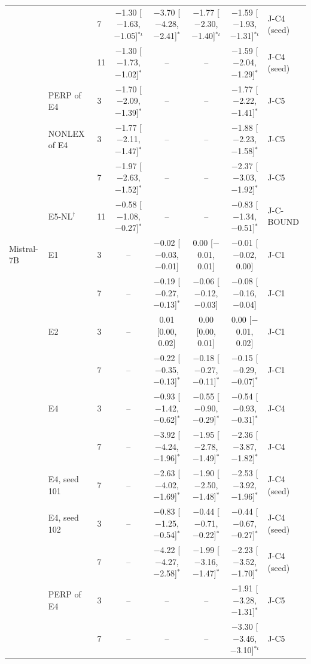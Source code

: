 \begin{tabular}{@{}lllcccc l@{}}
 &  & 7 & $-$1.30 [$-$1.63, $-$1.05]$^{*\iota}$ & $-$3.70 [$-$4.28, $-$2.41]$^{*}$ & $-$1.77 [$-$2.30, $-$1.40]$^{*\iota}$ & $-$1.59 [$-$1.93, $-$1.31]$^{*\iota}$ & J-C4 (seed) \\
 &  & 11 & $-$1.30 [$-$1.73, $-$1.02]$^{*}$ & -- & -- & $-$1.59 [$-$2.04, $-$1.29]$^{*}$ & J-C4 (seed) \\
 & PERP of E4 & 3 & $-$1.70 [$-$2.09, $-$1.39]$^{*}$ & -- & -- & $-$1.77 [$-$2.22, $-$1.41]$^{*}$ & J-C5 \\
 & NONLEX of E4 & 3 & $-$1.77 [$-$2.11, $-$1.47]$^{*}$ & -- & -- & $-$1.88 [$-$2.23, $-$1.58]$^{*}$ & J-C5 \\
 &  & 7 & $-$1.97 [$-$2.63, $-$1.52]$^{*}$ & -- & -- & $-$2.37 [$-$3.03, $-$1.92]$^{*}$ & J-C5 \\
 & E5-NL$^\dagger$ & 11 & $-$0.58 [$-$1.08, $-$0.27]$^{*}$ & -- & -- & $-$0.83 [$-$1.34, $-$0.51]$^{*}$ & J-C-BOUND \\
\midrule
Mistral-7B & E1 & 3 & -- & $-$0.02 [$-$0.03, $-$0.01] & 0.00 [$-$0.01, 0.01] & $-$0.01 [$-$0.02, 0.00] & J-C1 \\
 &  & 7 & -- & $-$0.19 [$-$0.27, $-$0.13]$^{*}$ & $-$0.06 [$-$0.12, $-$0.03] & $-$0.08 [$-$0.16, $-$0.04] & J-C1 \\
 & E2 & 3 & -- & 0.01 [0.00, 0.02] & 0.00 [0.00, 0.01] & 0.00 [$-$0.01, 0.02] & J-C1 \\
 &  & 7 & -- & $-$0.22 [$-$0.35, $-$0.13]$^{*}$ & $-$0.18 [$-$0.27, $-$0.11]$^{*}$ & $-$0.15 [$-$0.29, $-$0.07]$^{*}$ & J-C1 \\
 & E4 & 3 & -- & $-$0.93 [$-$1.42, $-$0.62]$^{*}$ & $-$0.55 [$-$0.90, $-$0.29]$^{*}$ & $-$0.54 [$-$0.93, $-$0.31]$^{*}$ & J-C4 \\
 &  & 7 & -- & $-$3.92 [$-$4.24, $-$1.96]$^{*}$ & $-$1.95 [$-$2.78, $-$1.49]$^{*}$ & $-$2.36 [$-$3.87, $-$1.82]$^{*}$ & J-C4 \\
 & E4, seed 101 & 7 & -- & $-$2.63 [$-$4.02, $-$1.69]$^{*}$ & $-$1.90 [$-$2.50, $-$1.48]$^{*}$ & $-$2.53 [$-$3.92, $-$1.96]$^{*}$ & J-C4 (seed) \\
 & E4, seed 102 & 3 & -- & $-$0.83 [$-$1.25, $-$0.54]$^{*}$ & $-$0.44 [$-$0.71, $-$0.22]$^{*}$ & $-$0.44 [$-$0.67, $-$0.27]$^{*}$ & J-C4 (seed) \\
 &  & 7 & -- & $-$4.22 [$-$4.27, $-$2.58]$^{*}$ & $-$1.99 [$-$3.16, $-$1.47]$^{*}$ & $-$2.23 [$-$3.52, $-$1.70]$^{*}$ & J-C4 (seed) \\
 & PERP of E4 & 3 & -- & -- & -- & $-$1.91 [$-$3.28, $-$1.31]$^{*}$ & J-C5 \\
 &  & 7 & -- & -- & -- & $-$3.30 [$-$3.46, $-$3.10]$^{*\iota}$ & J-C5 \\

\end{tabular}
